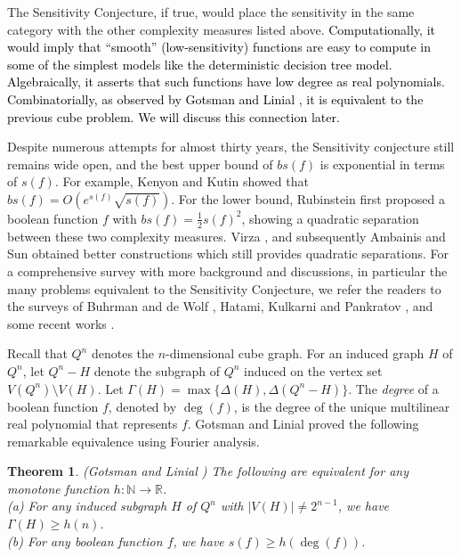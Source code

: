 \documentclass[12pt]{article}
\theoremstyle{plain}
\newtheorem{theorem}{Theorem}[section]
\theoremstyle{definition}
\begin{document}
The Sensitivity Conjecture, if true, would place the sensitivity in the same category with the other complexity measures listed above. \textcolor{black}{Computationally, it would imply that ``smooth'' (low-sensitivity) functions are easy to compute in some of the simplest models like the deterministic decision tree model. Algebraically, it asserts that such functions have low degree as real polynomials. Combinatorially, as observed by Gotsman and Linial \cite{gotsman-linial}, it is equivalent to the previous cube problem. We will discuss this connection later.}


Despite numerous attempts for almost thirty years, the Sensitivity conjecture still remains wide open, and the best upper bound of $bs(f)$ is exponential in terms of $s(f)$. For example, Kenyon and Kutin \cite{kenyon-kutin} showed that $bs(f)=O(e^{s(f)}\sqrt{s(f)})$. For the lower bound, Rubinstein \cite{rubinstein} first proposed a boolean function $f$ with $bs(f)=\frac{1}{2}s(f)^2$, showing a quadratic separation between these two complexity measures. Virza \cite{virza}, and subsequently Ambainis and Sun \cite{ambainis-sun} obtained better constructions which still provides quadratic separations.  For a comprehensive survey with more background and discussions, in particular the many problems equivalent to the Sensitivity Conjecture, we refer the readers to the surveys of Buhrman and de Wolf \cite{survey_bw},  Hatami, Kulkarni and Pankratov \cite{survey}, and some recent works \cite{drucker,GKS,GSW,tal}.  




Recall that $Q^n$ denotes the $n$-dimensional cube graph. For an induced graph $H$ of $Q^n$, let $Q^n-H$ denote the subgraph of $Q^n$ induced on the vertex set $V(Q^n) \setminus V(H)$. Let $\Gamma(H)=\max\{\Delta(H), \Delta(Q^n-H)\}$. The {\it degree} of a boolean function $f$, denoted by $\deg(f)$, is the degree of the unique multilinear real polynomial that represents $f$. Gotsman and Linial \cite{gotsman-linial} proved the following  remarkable equivalence using Fourier analysis.

\begin{theorem} (Gotsman and Linial \cite{gotsman-linial})
The following are equivalent for any monotone function $h: \mathbb{N} \rightarrow \mathbb{R}$.\\
(a) For any induced subgraph $H$ of $Q^n$ with $|V(H)|\neq 2^{n-1}$, we have $\Gamma(H) \ge h(n)$.\\
(b) For any boolean function $f$, we have $s(f) \ge h(\deg(f))$. 
\end{theorem}
\end{document}
